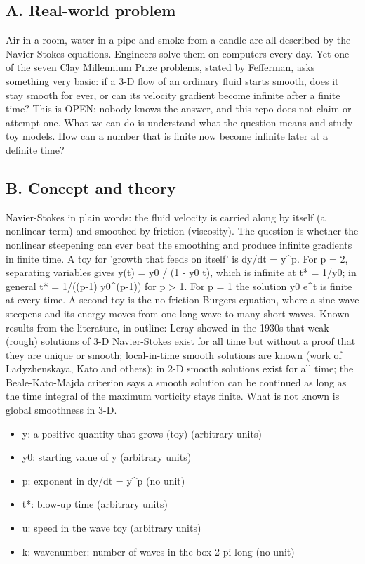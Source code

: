 \documentclass[11pt,a4paper]{article}
\begin{document}
\subsection*{A. Real-world problem}
Air in a room, water in a pipe and smoke from a candle are all described by the Navier-Stokes equations. Engineers solve them on computers every day. Yet one of the seven Clay Millennium Prize problems, stated by Fefferman, asks something very basic: if a 3-D flow of an ordinary fluid starts smooth, does it stay smooth for ever, or can its velocity gradient become infinite after a finite time? This is OPEN: nobody knows the answer, and this repo does not claim or attempt one. What we can do is understand what the question means and study toy models. How can a number that is finite now become infinite later at a definite time?

\subsection*{B. Concept and theory}
Navier-Stokes in plain words: the fluid velocity is carried along by itself (a nonlinear term) and smoothed by friction (viscosity). The question is whether the nonlinear steepening can ever beat the smoothing and produce infinite gradients in finite time. A toy for 'growth that feeds on itself' is dy/dt = y\textasciicircum{}p. For p = 2, separating variables gives y(t) = y0 / (1 - y0 t), which is infinite at t* = 1/y0; in general t* = 1/((p-1) y0\textasciicircum{}(p-1)) for p \textgreater{} 1. For p = 1 the solution y0 e\textasciicircum{}t is finite at every time. A second toy is the no-friction Burgers equation, where a sine wave steepens and its energy moves from one long wave to many short waves. Known results from the literature, in outline: Leray showed in the 1930s that weak (rough) solutions of 3-D Navier-Stokes exist for all time but without a proof that they are unique or smooth; local-in-time smooth solutions are known (work of Ladyzhenskaya, Kato and others); in 2-D smooth solutions exist for all time; the Beale-Kato-Majda criterion says a smooth solution can be continued as long as the time integral of the maximum vorticity stays finite. What is not known is global smoothness in 3-D.

\begin{itemize}[nosep]
\item y: a positive quantity that grows (toy) (arbitrary units)
\item y0: starting value of y (arbitrary units)
\item p: exponent in dy/dt = y\textasciicircum{}p (no unit)
\item t*: blow-up time (arbitrary units)
\item u: speed in the wave toy (arbitrary units)
\item k: wavenumber: number of waves in the box 2 pi long (no unit)
\end{itemize}
\end{document}
